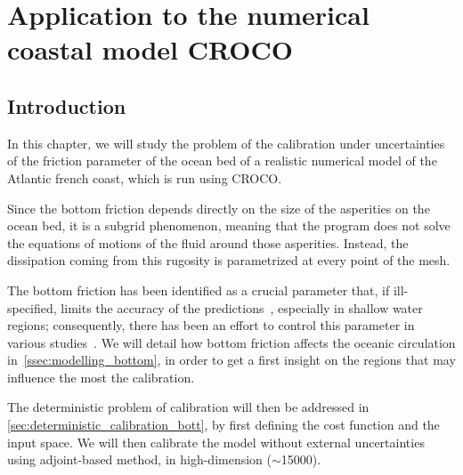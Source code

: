 \documentclass[../../Main_ManuscritThese.tex]{subfiles}
\newcommand{\CROCO}{CROCO}
\begin{document}
\chapter{Application to the numerical coastal model \CROCO}
\label{chap:croco}
\minitoc
\subfileLocal{\pagestyle{contentStyle}}

\section{Introduction}
\label{sec:intro_croco}


In this chapter, we will study the problem of the calibration under
uncertainties of the friction parameter of the ocean bed of a realistic
numerical model of the Atlantic french coast, which is run using \CROCO. 

Since the bottom friction depends directly on the size of the
asperities on the ocean bed, it is a subgrid phenomenon, meaning that
the program does not solve the equations of motions of the fluid
around those asperities. Instead, the dissipation coming from this
rugosity is parametrized at every point of the mesh.

The bottom friction has been identified as a crucial parameter that,
if ill-specified, limits the accuracy of the
predictions~\cite{sinha_principal_1997,kreitmair_effect_2019},
especially in shallow water regions; consequently, there has been an
effort to control this parameter in various
studies~\cite{das_variational_1992,das_estimation_1991,boutet_estimation_2015}.
We will detail how bottom friction affects the oceanic circulation
in~\cref{ssec:modelling_bottom}, in order to get a first insight on
the regions that may influence the most the calibration.

The deterministic problem of calibration will then be addressed in
\cref{sec:deterministic_calibration_bott}, by first defining the cost
function and the input space. We will then calibrate the model
without external uncertainties using adjoint-based method, in high-dimension ($\sim$\num{15000}).
\end{document}
